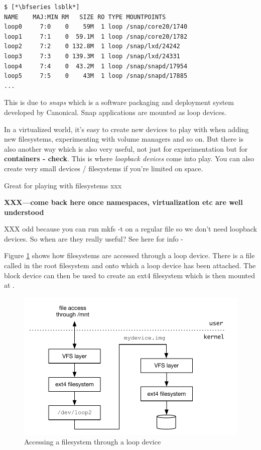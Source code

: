\begin{lstlisting}
$ [*\bfseries lsblk*]
NAME    MAJ:MIN RM   SIZE RO TYPE MOUNTPOINTS
loop0     7:0    0    59M  1 loop /snap/core20/1740
loop1     7:1    0  59.1M  1 loop /snap/core20/1782
loop2     7:2    0 132.8M  1 loop /snap/lxd/24242
loop3     7:3    0 139.3M  1 loop /snap/lxd/24331
loop4     7:4    0  43.2M  1 loop /snap/snapd/17954
loop5     7:5    0    43M  1 loop /snap/snapd/17885
...
\end{lstlisting}

\noindent
This is due to \textit{snaps} which is a software packaging and deployment system developed by Canonical. Snap applications are mounted as loop devices.

In a virtualized world, it's easy to create new devices to play with when adding new filesystems, experimenting with volume managers and so on. But there is also another way which is also very useful, not just for experimentation but for \textbf{containers - check}. This is where \textit{loopback devices} come into play. You can also create very small devices / filesystems if you're limited on space.

Great for playing with filesystems xxx

\textbf{XXX---come back here once namespaces, virtualization etc are well understood}

XXX odd because you can run mkfs -t on a regular file so we don't need loopback devices. So when are they really useful? See here for info - %

Figure \ref{fig:loopback} shows how filesystems are accessed through a loop device. There is a file called  in the root filesystem and onto which a loop device has been attached. The  block device can then be used to create an ext4 filesystem which is then mounted at .

\begin{figure}
	\includegraphics[scale=0.6]{figures/loopback.pdf}
	\centering
	\caption{Accessing a filesystem through a loop device}
	\label{fig:loopback}
\end{figure}

